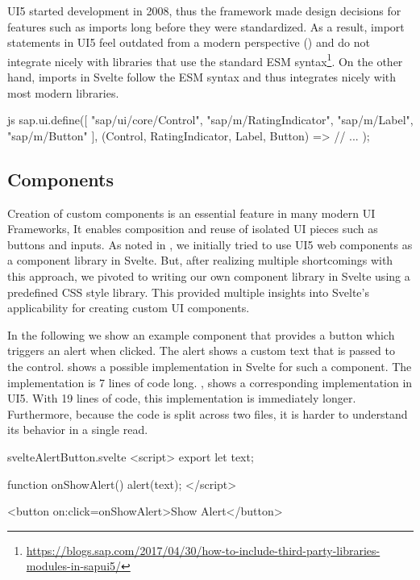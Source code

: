 UI5 started development in 2008, thus the framework made design decisions for features such as imports long before they were standardized. As a result, import statements in UI5 feel outdated from a modern perspective () and do not integrate nicely with libraries that use the standard ESM syntax\footnote{\url{https://blogs.sap.com/2017/04/30/how-to-include-third-party-libraries-modules-in-sapui5/}}. On the other hand, imports in Svelte follow the ESM syntax and thus integrates nicely with most modern libraries.


\begin{listing}[H]
\begin{myminted}{js}{}
sap.ui.define([
  "sap/ui/core/Control",
  "sap/m/RatingIndicator",
  "sap/m/Label",
  "sap/m/Button"
], (Control, RatingIndicator, Label, Button) => {
  // ...
});
\end{myminted}
\caption{Example of UI5's import syntax.}
\label{fig:evaluation-ui5-import}
\end{listing}

\subsection{Components}
Creation of custom components is an essential feature in many modern UI Frameworks, It enables composition and reuse of isolated UI pieces such as buttons and inputs. As noted in , we initially tried to use UI5 web components as a component library in Svelte. But, after realizing multiple shortcomings with this approach, we pivoted to writing our own component library in Svelte using a predefined CSS style library. This provided multiple insights into Svelte's applicability for creating custom UI components.

In the following we show an example component that provides a button which triggers an alert when clicked. The alert shows a custom text that is passed to the control.  shows a possible implementation in Svelte for such a component. The implementation is 7 lines of code long. , shows a corresponding implementation in UI5. With 19 lines of code, this implementation is immediately longer. Furthermore, because the code is split across two files, it is harder to understand its behavior in a single read. 

\begin{listing}[H]
\begin{myminted}{svelte}{AlertButton.svelte}
<script>
  export let text;

  function onShowAlert() {
    alert(text);
  }
</script>

<button on:click={onShowAlert}>Show Alert</button>
\end{myminted}
\caption{Alert button implementation in Svelte.}
\label{fig:evaluation-component-svelte}
\end{listing}

